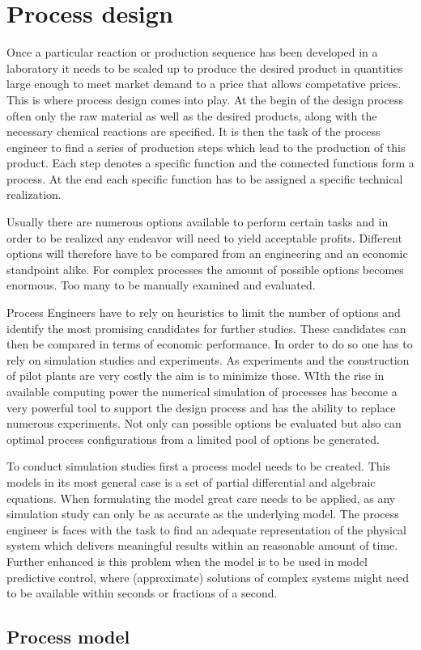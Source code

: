 \chapter{Process design}
\label{chp:proces_design}

Once a particular reaction or production sequence has been developed in a laboratory it needs to be scaled 
up to produce the desired product in quantities large enough to meet market demand to a price that allows 
competative prices. This is where process design comes into play. At the begin of the design process often 
only the raw material as well as the desired products, along with the necessary chemical reactions are 
specified. It is then the task of the process engineer to find a series of production steps which lead to the 
production of this product. Each step denotes a specific function and the connected functions form a process.
 At the end each specific function has to be assigned a specific technical realization. 

Usually there are numerous options available to perform certain tasks and in order to be realized any 
endeavor will need to yield acceptable profits. Different options will therefore have to be compared  from an 
engineering and an economic standpoint alike. For complex processes the amount of possible options 
becomes enormous. Too many to be manually examined and evaluated. 

Process Engineers have to rely on heuristics to limit the number of options and identify the most promising 
candidates for further studies. These candidates can then be compared in terms of economic performance. 
In order to do so one has to rely on simulation studies and experiments. As experiments and the construction 
of pilot plants are very costly the aim is to minimize those. WIth the rise in available computing power the 
numerical simulation of processes has become a very powerful tool to support the design process and has 
the ability to replace numerous experiments. Not only can possible options be evaluated but also can 
optimal process configurations from a limited pool of options be generated. 

To conduct simulation studies first a process model needs to be created. This models in its most general 
case is a set of partial differential and algebraic equations. When formulating the model great care needs 
to be applied, as any simulation study can only be as accurate as the underlying model. The process 
engineer is faces with the task to find an adequate representation of the physical system which delivers 
meaningful results within an reasonable amount of time. Further enhanced is this problem when the model 
is to be used in model predictive control, where (approximate) solutions of complex systems might need to 
be available within seconds or fractions of a second. 


\section{Process model}
\label{sec:process_model}

